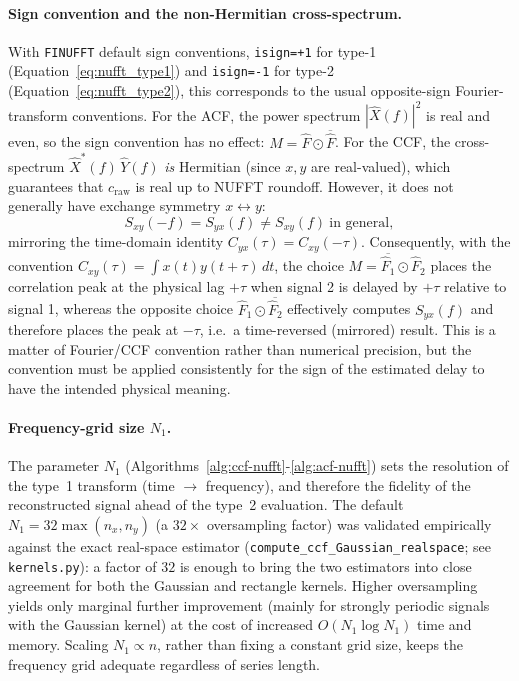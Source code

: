 \documentclass[twocolumn,10pt]{article}
\begin{document}
\paragraph{\bf Sign convention and the non-Hermitian cross-spectrum.}
%
With \texttt{FINUFFT} default sign conventions,
\texttt{isign=+1} for type-1 (Equation~\ref{eq:nufft_type1}) and
\texttt{isign=-1} for type-2 (Equation~\ref{eq:nufft_type2}), this 
corresponds to the usual opposite-sign Fourier-transform conventions.
For the ACF, the power spectrum $|\hat X(f)|^2$ is real and even, so the
sign convention has no effect:
$M=\hat F\odot\overline{\hat F}$.
For the CCF, the cross-spectrum $\hat X^\ast(f)\,\hat Y(f)$ \emph{is}
Hermitian (since $x,y$ are real-valued), which guarantees that
$c_{\mathrm{raw}}$ is real up to NUFFT roundoff. However, it does not
generally have exchange symmetry $x\leftrightarrow y$:
$$
S_{xy}(-f)=S_{yx}(f)\neq S_{xy}(f)\ \text{in general},
$$
mirroring the time-domain identity
$C_{yx}(\tau)=C_{xy}(-\tau)$.
Consequently, with the convention
$C_{xy}(\tau)=\int x(t)y(t+\tau)\,dt$, the choice
$M=\overline{\hat F_1}\odot\hat F_2$ places the correlation peak at the
physical lag $+\tau$ when signal 2 is delayed by $+\tau$ relative to
signal 1, whereas the opposite choice
$\hat F_1\odot\overline{\hat F_2}$ effectively computes $S_{yx}(f)$ and
therefore places the peak at $-\tau$, i.e.\ a time-reversed (mirrored)
result. This is a matter of Fourier/CCF convention rather than numerical
precision, but the convention must be applied consistently for the sign
of the estimated delay to have the intended physical meaning.
%
\paragraph{\bf Frequency-grid size $N_1$.}
%
The parameter $N_1$ (Algorithms~\ref{alg:ccf-nufft}-\ref{alg:acf-nufft})  sets the resolution of the type~1 transform (time
$\to$ frequency), and therefore the fidelity of the reconstructed
signal ahead of the type~2 evaluation. The default
$N_1 = 32\max(n_x,n_y)$ (a $32\times$ oversampling factor) was
validated empirically against the exact real-space estimator
(\texttt{compute\_ccf\_Gaussian\_realspace}; see
\texttt{kernels.py}): a factor of $32$ is enough to bring the two
estimators into close agreement for both the Gaussian and rectangle
kernels. Higher oversampling yields only marginal further improvement
(mainly for strongly periodic signals with the Gaussian kernel) at the
cost of increased $O(N_1\log N_1)$ time and memory. Scaling
$N_1\propto n$, rather than fixing a constant grid size, keeps the
frequency grid adequate regardless of series length.
%
\end{document}
